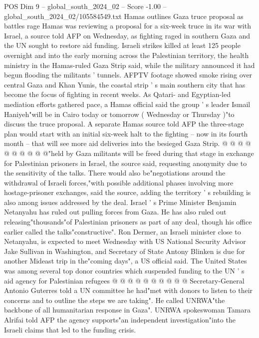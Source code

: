 \begin{textsample}{POS Dim 9 – global\_south\_2024\_02 – Score -1.00 – global\_south\_2024\_02/105584549.txt}  \label{ex:f9_pos_100}
Hamas outlines Gaza truce proposal as battles rage Hamas was reviewing a proposal for a six-week truce in its war with Israel, a source told AFP on Wednesday, as fighting raged in southern Gaza and the UN sought to restore aid funding.
Israeli strikes killed at least 125 people overnight and into the early morning across the Palestinian territory, the health ministry in the Hamas-ruled Gaza Strip said, while the military announced it had begun flooding the militants ' tunnels.
AFPTV footage showed smoke rising over central Gaza and Khan Yunis, the coastal strip ' s main southern city that has become the focus of fighting in recent weeks.
As Qatari- and Egyptian-led mediation efforts gathered pace, a Hamas official said the group ' s leader Ismail Haniyeh"will be in Cairo today or tomorrow ( Wednesday or Thursday )"to discuss the truce proposal.
A separate Hamas source told AFP the three-stage plan would start with an initial six-week halt to the fighting -- now in its fourth month -- that will see more aid deliveries into the besieged Gaza Strip. @ @ @ @ @ @ @ @ @ @"held by Gaza militants will be freed during that stage in exchange for Palestinian prisoners in Israel, the source said, requesting anonymity due to the sensitivity of the talks.
There would also be"negotiations around the withdrawal of Israeli forces,"with possible additional phases involving more hostage-prisoner exchanges, said the source, adding the territory ' s rebuilding is also among issues addressed by the deal.
Israel ' s Prime Minister Benjamin Netanyahu has ruled out pulling forces from Gaza.
He has also ruled out releasing"thousands"of Palestinian prisoners as part of any deal, though his office earlier called the talks"constructive".
Ron Dermer, an Israeli minister close to Netanyahu, is expected to meet Wednesday with US National Security Advisor Jake Sullivan in Washington, and Secretary of State Antony Blinken is due for another Mideast trip in the"coming days", a US official said.
The United States was among several top donor countries which suspended funding to the UN ' s aid agency for Palestinian refugees @ @ @ @ @ @ @ @ @ @ Secretary-General Antonio Guterres told a UN committee he had"met with donors to listen to their concerns and to outline the steps we are taking".
He called UNRWA"the backbone of all humanitarian response in Gaza".
UNRWA spokeswoman Tamara Alrifai told AFP the agency supports"an independent investigation"into the Israeli claims that led to the funding crisis.

\end{textsample}
